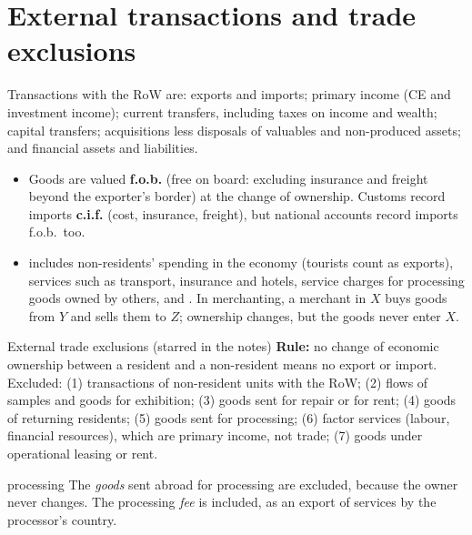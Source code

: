 \section{External transactions and trade exclusions}\label{sec:ext}

Transactions with the RoW are: exports and imports; primary income (CE and investment income);
current transfers, including taxes on income and wealth; capital transfers; acquisitions less
disposals of valuables and non-produced assets; and financial assets and liabilities.

\begin{itemize}
\item {} Goods are valued \textbf{f.o.b.} (free on board: excluding insurance and
  freight beyond the exporter's border) at the change of ownership. Customs record imports
  \textbf{c.i.f.} (cost, insurance, freight), but national accounts record imports f.o.b.\ too.
\item {} includes non-residents' spending in the economy (tourists count as exports),
  services such as transport, insurance and hotels, service charges for processing goods owned by
  others, and . In merchanting, a merchant in $X$ buys goods from $Y$ and sells
  them to $Z$; ownership changes, but the goods never enter $X$.
\end{itemize}

\begin{keybox}{External trade exclusions (starred in the notes)}
\small \textbf{Rule:} no change of economic ownership between a resident and a non-resident means
no export or import. Excluded:
(1) transactions of non-resident units with the RoW;
(2) flows of samples and goods for exhibition;
(3) goods sent for repair or for rent;
(4) goods of returning residents;
(5) goods sent for processing;
(6) factor services (labour, financial resources), which are primary income, not trade;
(7) goods under operational leasing or rent.
\end{keybox}

\begin{trap}{processing}
\small The \emph{goods} sent abroad for processing are excluded, because the owner never changes.
The processing \emph{fee} is included, as an export of services by the processor's country.
\end{trap}

